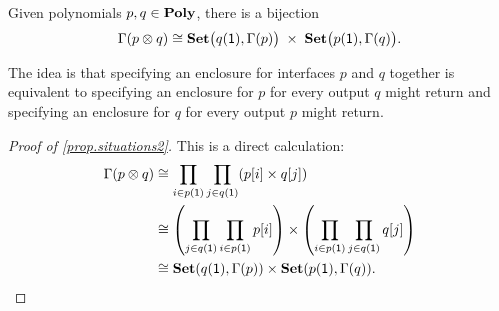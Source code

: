 \documentclass[Book-Poly]{subfiles}
\begin{document}
\begin{proposition}\label{prop.situations2}
Given polynomials $p,q\in\mathbf{Poly}$, there is a bijection
\begin{equation} \label{eqn.situations2}
\Gamma(p\otimes q)\cong\mathbf{Set}\big(q(\textsf{1}),\Gamma(p)\big)\;\times\;\mathbf{Set}\big(p(\textsf{1}),\Gamma(q)\big).
\end{equation}
\end{proposition}
The idea is that specifying an enclosure for interfaces $p$ and $q$ together is equivalent to specifying an enclosure for $p$ for every output $q$ might return and specifying an enclosure for $q$ for every output $p$ might return.
\begin{proof}[Proof of \cref{prop.situations2}]
This is a direct calculation:
\begin{align*}
	\Gamma(p\otimes q) &\cong
	\prod_{i\in p(\textsf{1})}\prod_{j\in q(\textsf{1})}(p[i]\times q[j]) \\
	&\cong
	\left(\prod_{j\in q(\textsf{1})}\prod_{i\in p(\textsf{1})}p[i]\right)\times
		 \left(\prod_{i\in p(\textsf{1})}\prod_{j\in q(\textsf{1})}q[j]\right) \\
	&\cong
	\mathbf{Set}(q(\textsf{1}),\Gamma(p))\times\mathbf{Set}(p(\textsf{1}),\Gamma(q)).
\end{align*}
\end{proof}
\end{document}
